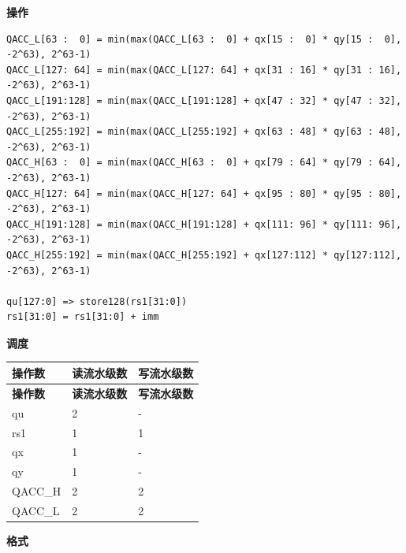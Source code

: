 \textbf{操作}\\
\begin{lstlisting}
QACC_L[63 :  0] = min(max(QACC_L[63 :  0] + qx[15 :  0] * qy[15 :  0], -2^63), 2^63-1)
QACC_L[127: 64] = min(max(QACC_L[127: 64] + qx[31 : 16] * qy[31 : 16], -2^63), 2^63-1)
QACC_L[191:128] = min(max(QACC_L[191:128] + qx[47 : 32] * qy[47 : 32], -2^63), 2^63-1)
QACC_L[255:192] = min(max(QACC_L[255:192] + qx[63 : 48] * qy[63 : 48], -2^63), 2^63-1)
QACC_H[63 :  0] = min(max(QACC_H[63 :  0] + qx[79 : 64] * qy[79 : 64], -2^63), 2^63-1)
QACC_H[127: 64] = min(max(QACC_H[127: 64] + qx[95 : 80] * qy[95 : 80], -2^63), 2^63-1)
QACC_H[191:128] = min(max(QACC_H[191:128] + qx[111: 96] * qy[111: 96], -2^63), 2^63-1)
QACC_H[255:192] = min(max(QACC_H[255:192] + qx[127:112] * qy[127:112], -2^63), 2^63-1)

qu[127:0] => store128(rs1[31:0])
rs1[31:0] = rs1[31:0] + imm
\end{lstlisting}

\textbf{调度}\\
\begin{longtable}[c]{|l|l|l|}
    \hline
    \rowcolor{lightgray}
    \textbf{操作数} & \textbf{读流水级数} & \textbf{写流水级数} \\\hline
    \endfirsthead
    \hline
    \rowcolor{lightgray}
     \textbf{操作数} & \textbf{读流水级数} & \textbf{写流水级数} \\\hline
    \endhead
    \hline
    \endfoot

    qu & 2 & - \\\hline
    rs1 & 1 & 1 \\\hline

     qx & 1 & - \\\hline
     qy & 1 & - \\\hline
     QACC\_H & 2 & 2 \\\hline
     QACC\_L & 2 & 2

\end{longtable}

\textbf{格式}\\

